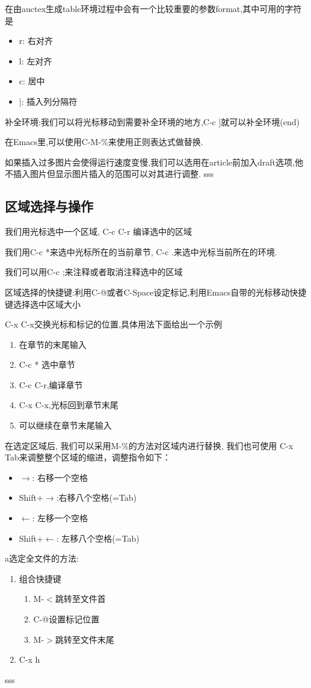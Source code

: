 \documentclass[UTF8]{ctexart}
\begin{document}
在由auctex生成table环境过程中会有一个比较重要的参数format,其中可用的字符是
\begin{itemize}
\item r: 右对齐
\item l: 左对齐
\item c: 居中
\item |: 插入列分隔符
\end{itemize}

补全环境:我们可以将光标移动到需要补全环境的地方,C-c ]就可以补全环境(end)

在Emacs里,可以使用C-M-\%来使用正则表达式做替换.

如果插入过多图片会使得运行速度变慢,我们可以选用在article前加入draft选项,他不插入图片但显示图片插入的范围可以对其进行调整.
sss
\subsection{区域选择与操作}
我们用光标选中一个区域, C-c C-r 编译选中的区域

我们用C-c *来选中光标所在的当前章节, C-c .来选中光标当前所在的环境.

我们可以用C-c ;来注释或者取消注释选中的区域

区域选择的快捷键:利用C-@或者C-Space设定标记,利用Emacs自带的光标移动快捷键选择选中区域大小

C-x C-x交换光标和标记的位置,具体用法下面给出一个示例
\begin{enumerate}
\item 在章节的末尾输入
\item C-c * 选中章节
\item C-c C-r,编译章节
\item C-x C-x,光标回到章节末尾
\item 可以继续在章节末尾输入
\end{enumerate}

在选定区域后, 我们可以采用M-\%的方法对区域内进行替换, 我们也可使用 C-x Tab来调整整个区域的缩进，调整指令如下：
\begin{itemize}
\item $\rightarrow$: 右移一个空格
\item Shift+$\rightarrow$:右移八个空格(=Tab)
\item $\leftarrow$: 左移一个空格
\item Shift+$\leftarrow$: 左移八个空格(=Tab)
\end{itemize}
a选定全文件的方法:
\begin{enumerate}
\item 组合快捷键
  \begin{enumerate}
  \item M-$<$跳转至文件首
  \item C-@设置标记位置
  \item M-$>$跳转至文件末尾
  \end{enumerate}
\item C-x h
\end{enumerate}sss
\end{document}
